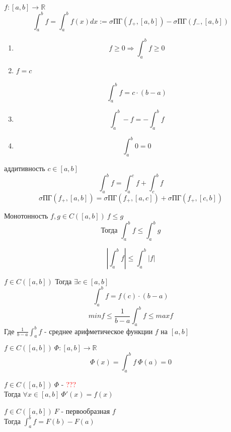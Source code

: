 \documentclass[12pt]{article}
\begin{document}
\begin{definition}
  $f: [a, b] \rightarrow \mathbb{R}$ \\
  $$\int_a^bf=\int_a^bf(x)dx := \sigma \textrm{ПГ}(f_+,[a,b])-\sigma \textrm{ПГ}(f_-, [a,b])$$
\end{definition}
\begin{note}
  \begin{enumerate}
  \item $$f \ge 0 \Rightarrow \int_a^bf \ge 0$$
  \item $f = c$ \\\
    $$\int_a^bf = c \cdot (b - a)$$
  \item $$\int_a^b-f = -\int_a^bf$$
  \item $$\int_a^b0 = 0$$
  \end{enumerate}
\end{note}
\begin{features}
  \item аддитивность $c \in [a, b]$ \\
    $$\int_a^bf = \int_a^cf + \int_c^bf$$
    $$\sigma \textrm{ПГ}(f_+, [a, b]) = \sigma \textrm{ПГ}(f_+, [a, c]) + \sigma \textrm{ПГ}(f_+, [c, b])$$
  \item Монотонность $f, g \in C([a, b])\ f \le g$ \\
    $$\textrm{Тогда } \int_a^bf \le \int_a^bg$$
  \item $$\left| \int_a^b f \right| \le \int_a^b\left| f \right|$$
\end{features}
\begin{theorem}[О среднем]
  $f \in C([a, b])$ Тогда $\exists c \in [a, b]$
  $$\int_a^bf = f(c) \cdot (b - a)$$
  $$min f \le \frac{1}{b-a}\int_a^bf \le max f$$
  Где $\frac{1}{b-a}\int_a^bf$ - среднее арифметическое функции $f$ на $[a, b]$ 
\end{theorem}
\begin{definition}
  $f \in C([a, b])\ \Phi: [a,b] \rightarrow \mathbb{R}$
  $$\Phi(x) = \int_a^bf\ \Phi(a) = 0$$
\end{definition}
\begin{theorem}[Барроу]
  $f \in C([a, b])\ \Phi$ - \textcolor{red}{???} \\
  Тогда $\forall x \in [a, b]\ \Phi'(x) = f(x)$
\end{theorem}
\begin{theorem}
  $f \in C([a, b])\ F$ - первообразная $f$ \\
  Тогда $\int_a^bf=F(b) - F(a)$
\end{theorem}
\end{document}
